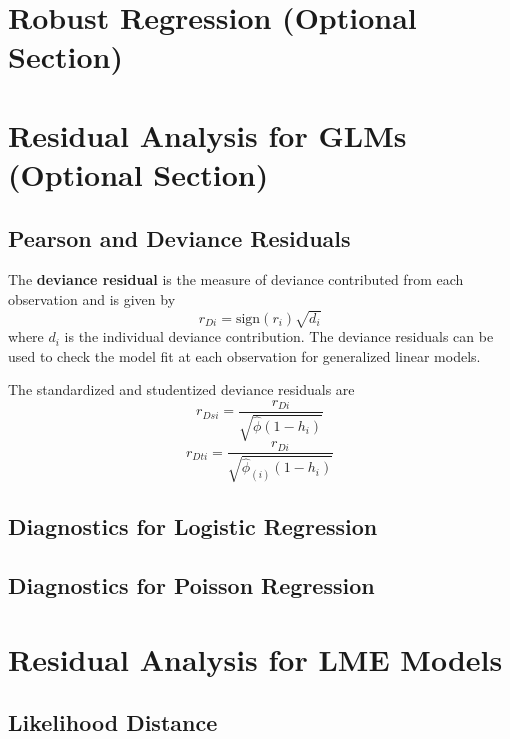 \documentclass[12pt]{article}
\begin{document}
\section{Robust Regression (Optional Section)}

\newpage
\section{Residual Analysis for GLMs (Optional Section)}

\subsection{Pearson and Deviance Residuals} 





The \textbf{deviance residual} is the measure of deviance contributed from each observation and is given by
\[r_{Di} = \textrm{sign}( r_{i})
 \sqrt{ d_{i}}\]
where $d_i$ is the individual deviance contribution.
The deviance residuals can be used to check the model fit at each observation for generalized linear models. 


The standardized and studentized deviance residuals are
\[
r_{Dsi} = \frac{r_{Di}}{\sqrt{\hat{ \phi} (1- h_{i})} }\]
\[r_{Dti} = \frac{r_{Di}}{\sqrt{ \hat{ \phi}_{(i)}
 (1- h_{i})}}\]
 
 
\subsection{Diagnostics for Logistic Regression}

\subsection{Diagnostics for Poisson Regression}
\newpage
\section{Residual Analysis for LME Models}

\subsection{Likelihood Distance}
\end{document}
